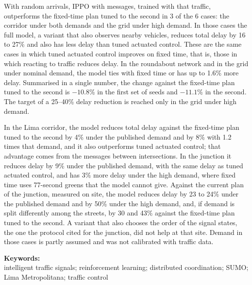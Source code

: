 With random arrivals, IPPO with messages, trained with that traffic, outperforms the fixed-time plan tuned to the second in 3 of the 6 cases: the corridor under both demands and the grid under high demand. In those cases the full model, a variant that also observes nearby vehicles, reduces total delay by 16 to 27\% and also has less delay than tuned actuated control. These are the same cases in which tuned actuated control improves on fixed time, that is, those in which reacting to traffic reduces delay. In the roundabout network and in the grid under nominal demand, the model ties with fixed time or has up to 1.6\% more delay. Summarised in a single number, the change against the fixed-time plan tuned to the second is $-10.8$\% in the first set of seeds and $-11.1$\% in the second. The target of a 25--40\% delay reduction is reached only in the grid under high demand.

In the Lima corridor, the model reduces total delay against the fixed-time plan tuned to the second by 4\% under the published demand and by 8\% with 1.2 times that demand, and it also outperforms tuned actuated control; that advantage comes from the messages between intersections. In the junction it reduces delay by 9\% under the published demand, with the same delay as tuned actuated control, and has 3\% more delay under the high demand, where fixed time uses 77-second greens that the model cannot give. Against the current plan of the junction, measured on site, the model reduces delay by 23 to 24\% under the published demand and by 50\% under the high demand, and, if demand is split differently among the streets, by 30 and 43\% against the fixed-time plan tuned to the second. A variant that also chooses the order of the signal states, the one the protocol cited for the junction, did not help at that site. Demand in those cases is partly assumed and was not calibrated with traffic data.

\noindent \textbf{Keywords:}\\
\noindent intelligent traffic signals; reinforcement learning; distributed coordination; SUMO; Lima Metropolitana; traffic control
